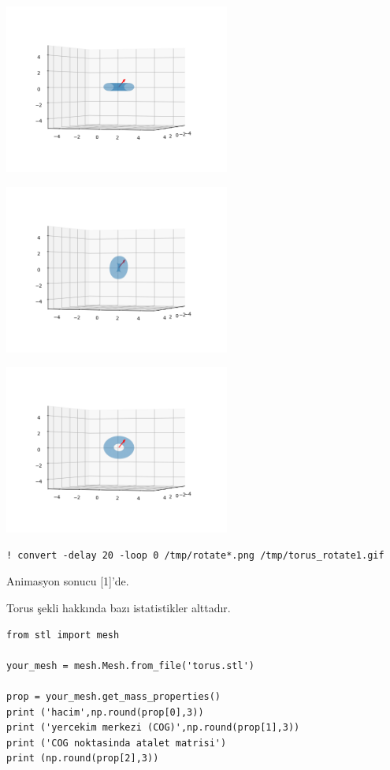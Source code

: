 \documentclass[12pt,fleqn]{article}\usepackage{../../common}
\begin{document}
\includegraphics[width=20em]{sim1/rotate_00.png}

\includegraphics[width=20em]{sim1/rotate_08.png}

\includegraphics[width=20em]{sim1/rotate_14.png}

\begin{verbatim}
! convert -delay 20 -loop 0 /tmp/rotate*.png /tmp/torus_rotate1.gif
\end{verbatim}

Animasyon sonucu [1]'de.

Torus şekli hakkında bazı istatistikler alttadır.

\begin{verbatim}
from stl import mesh

your_mesh = mesh.Mesh.from_file('torus.stl')

prop = your_mesh.get_mass_properties()
print ('hacim',np.round(prop[0],3))
print ('yercekim merkezi (COG)',np.round(prop[1],3))
print ('COG noktasinda atalet matrisi')
print (np.round(prop[2],3))
\end{verbatim}
\end{document}
